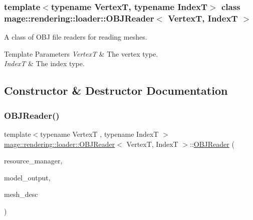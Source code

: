 \subsubsection*{template$<$typename VertexT, typename IndexT$>$\newline
class mage\+::rendering\+::loader\+::\+O\+B\+J\+Reader$<$ Vertex\+T, Index\+T $>$}

A class of O\+BJ file readers for reading meshes.


\begin{DoxyTemplParams}{Template Parameters}
{\em VertexT} & The vertex type. \\
\hline
{\em IndexT} & The index type. \\
\hline
\end{DoxyTemplParams}


\subsection{Constructor \& Destructor Documentation}
\mbox{\label{classmage_1_1rendering_1_1loader_1_1_o_b_j_reader_a5fe68a545e05c266b69f35e4dc9027a9}} 
\subsubsection{\texorpdfstring{O\+B\+J\+Reader()}{OBJReader()}\hspace{0.1cm}{\footnotesize\ttfamily [1/3]}}
{\footnotesize\ttfamily template$<$typename VertexT , typename IndexT $>$ \\
\mbox{\hyperlink{classmage_1_1rendering_1_1loader_1_1_o_b_j_reader}{mage\+::rendering\+::loader\+::\+O\+B\+J\+Reader}}$<$ VertexT, IndexT $>$\+::\mbox{\hyperlink{classmage_1_1rendering_1_1loader_1_1_o_b_j_reader}{O\+B\+J\+Reader}} (\begin{DoxyParamCaption}\item[{\mbox{\hyperlink{classmage_1_1rendering_1_1_resource_manager}{Resource\+Manager}} \&}]{resource\+\_\+manager,  }\item[{\mbox{\hyperlink{structmage_1_1rendering_1_1_model_output}{Model\+Output}}$<$ VertexT, IndexT $>$ \&}]{model\+\_\+output,  }\item[{const \mbox{\hyperlink{classmage_1_1rendering_1_1_mesh_descriptor}{Mesh\+Descriptor}}$<$ VertexT, IndexT $>$ \&}]{mesh\+\_\+desc }\end{DoxyParamCaption})\hspace{0.3cm}{\ttfamily [explicit]}}

